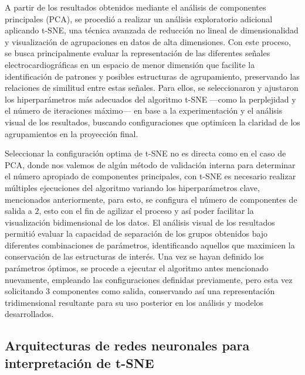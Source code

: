 \documentclass[12pt,letterpaper,oneside,openright]{book}
\begin{document}
A partir de los resultados obtenidos mediante el análisis de componentes principales (PCA), se procedió a realizar un análisis exploratorio adicional aplicando t-SNE, una técnica avanzada de reducción no lineal de dimensionalidad y visualización de agrupaciones en datos de alta dimensiones. Con este proceso, se busca principalmente evaluar la representación de las diferentes señales electrocardiográficas en un espacio de menor dimensión que facilite la identificación de patrones y posibles estructuras de agrupamiento, preservando las relaciones de similitud entre estas señales. Para ellos, se seleccionaron y ajustaron los hiperparámetros más adecuados del algoritmo t-SNE ---como la perplejidad y el número de iteraciones máximo--- en base a la experimentación y el análisis visual de los resultados, buscando configuraciones que optimicen la claridad de los agrupamientos en la proyección final.

Seleccionar la configuración optima de t-SNE no es directa como en el caso de PCA, donde nos valemos de algún método de validación interna para determinar el número apropiado de componentes principales, con t-SNE es necesario realizar múltiples ejecuciones del algoritmo variando los hiperparámetros clave, mencionados anteriormente, para esto, se configura el número de componentes de salida a $2$, esto con el fin de agilizar el proceso y así poder facilitar la visualización bidimensional de los datos. El análisis visual de los resultados permitió evaluar la capacidad de separación de los grupos obtenidos bajo diferentes combinaciones de parámetros, identificando aquellos que maximicen la conservación de las estructuras de interés. Una vez se hayan definido los parámetros óptimos, se procede a ejecutar el algoritmo antes mencionado nuevamente, empleando las configuraciones definidas previamente, pero esta vez solicitando $3$ componentes como salida, conservando así una representación tridimensional resultante para su uso posterior en los análisis y modelos desarrollados.

\subsection{Arquitecturas de redes neuronales para interpretación de t-SNE}
\end{document}
